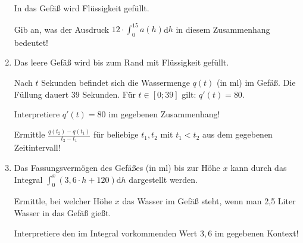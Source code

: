 \begin{langesbeispiel}
\begin{enumerate}
	In das Gefäß wird Flüssigkeit gefüllt.
	
	Gib an, was der Ausdruck $12\cdot\displaystyle\int^{15}_0{a(h)}$d$h$ in diesem Zusammenhang bedeutet!
\item Das leere Gefäß wird bis zum Rand mit Flüssigkeit gefüllt.

Nach $t$ Sekunden befindet sich die Wassermenge $q(t)$ (in ml) im Gefäß. Die Füllung dauert 39 Sekunden. Für $t\in[0;39]$ gilt: $q'(t)=80$.

Interpretiere $q'(t)=80$ im gegebenen Zusammenhang!

Ermittle $\frac{q(t_2)-q(t_1)}{t_2-t_1}$ für beliebige $t_1,t_2$ mit $t_1<t_2$ aus dem gegebenen Zeitintervall!
\item Das Fassungsvermögen des Gefäßes (in ml) bis zur Höhe $x$ kann durch das Integral $\int^x_0{(3,6\cdot h+120)}$d$h$ dargestellt werden.

Ermittle, bei welcher Höhe $x$ das Wasser im Gefäß steht, wenn man 2,5 Liter Wasser in das Gefäß gießt.

Interpretiere den im Integral vorkommenden Wert $3,6$ im gegebenen Kontext!
						\end{enumerate}\leer
				
\end{langesbeispiel}
